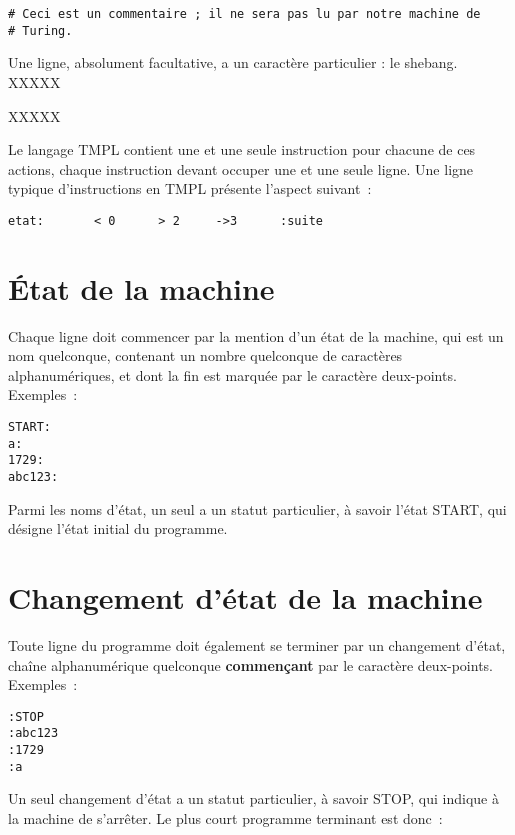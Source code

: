 \documentclass[a4paper, 11pt]{report}
\begin{document}
\begin{verbatim}
# Ceci est un commentaire ; il ne sera pas lu par notre machine de 
# Turing.
\end{verbatim}

\par

Une ligne, absolument facultative, a un caractère particulier : le
shebang. XXXXX

XXXXX

Le langage TMPL contient une et une seule instruction pour chacune de
ces actions, chaque instruction devant occuper une et une seule ligne.
Une ligne typique d'instructions en TMPL présente l'aspect suivant~:

\begin{verbatim}
etat:       < 0      > 2     ->3      :suite
\end{verbatim}



\section{État de la machine}

Chaque ligne doit commencer par la mention d'un état de la machine, qui
est un nom quelconque, contenant un nombre quelconque de caractères
alphanumériques, et dont la fin est marquée par le caractère
deux-points. Exemples~: 

\begin{verbatim}
START:
a:
1729:
abc123:
\end{verbatim}

Parmi les noms d'état, un seul a un statut particulier, à savoir l'état
START, qui désigne l'état initial du programme.



\section{Changement d'état de la machine}

Toute ligne du programme doit également se terminer par un changement
d'état, chaîne alphanumérique quelconque \textbf{commençant} par le
caractère deux-points. Exemples~:


\begin{verbatim}
:STOP
:abc123
:1729
:a
\end{verbatim}

Un seul changement d'état a un statut particulier, à savoir STOP, qui
indique à la machine de s'arrêter. Le plus court programme terminant est
donc~: 
\end{document}
